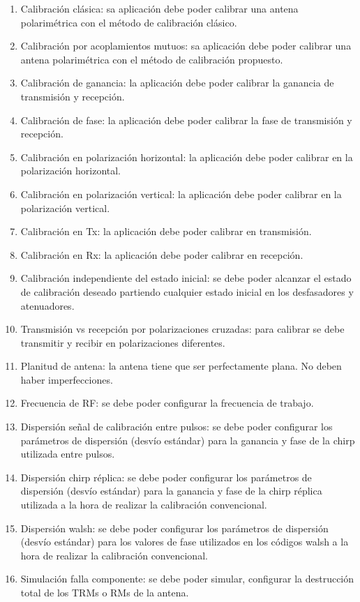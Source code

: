 \begin{enumerate}
    \item Calibración clásica: sa aplicación debe poder calibrar una antena polarimétrica con el método de calibración clásico.

    \item Calibración por acoplamientos mutuos: sa aplicación debe poder calibrar una antena polarimétrica con el método de
		calibración propuesto.

    \item Calibración de ganancia: la aplicación debe poder calibrar la ganancia de transmisión y recepción.

    \item Calibración de fase: la aplicación debe poder calibrar la fase de transmisión y recepción.

    \item Calibración en polarización horizontal: la aplicación debe poder calibrar en la polarización horizontal.
    \item Calibración en polarización vertical: la aplicación debe poder calibrar en la polarización vertical.
    \item Calibración en Tx: la aplicación debe poder calibrar en transmisión.
    \item Calibración en Rx: la aplicación debe poder calibrar en recepción.

    \item Calibración independiente del estado inicial: se debe poder alcanzar el estado de calibración deseado partiendo
		cualquier estado inicial en los desfasadores y atenuadores.

    \item Transmisión vs recepción por polarizaciones cruzadas: para calibrar se debe transmitir y recibir en polarizaciones
		diferentes.

    \item Planitud de antena: la antena tiene que ser perfectamente plana. No deben haber imperfecciones.

    \item Frecuencia de RF: se debe poder configurar la frecuencia de trabajo.

    \item Dispersión señal de calibración entre pulsos: se debe poder configurar los parámetros de dispersión (desvío estándar) para
		la ganancia y fase de la chirp utilizada entre pulsos.

    \item Dispersión chirp réplica: se debe poder configurar los parámetros de dispersión (desvío estándar) para la
		ganancia y fase de la chirp réplica utilizada a la hora de realizar la calibración convencional.

    \item Dispersión walsh: se debe poder configurar los parámetros de dispersión (desvío estándar) para los valores de fase
		utilizados en los códigos walsh a la hora de realizar la calibración convencional.

    \item Simulación falla componente: se debe poder simular, configurar la destrucción total de los TRMs o RMs de la antena.
\end{enumerate}


